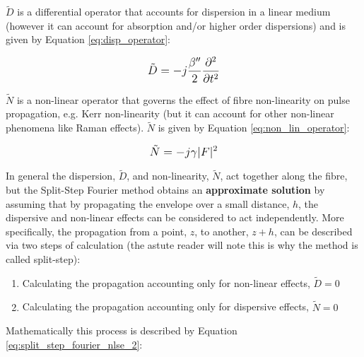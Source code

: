 \documentclass[colorlinks,11pt,a4paper,normalphoto,withhyper,ragged2e]{altareport}
\begin{document}
	
	\vspace{5mm}
	
	
	$\tilde{D}$ is a differential operator that accounts for dispersion in a linear medium (however it can account for absorption and/or higher order dispersions) and is given by Equation \ref{eq:disp_operator}:
	
	\begin{equation} \label{eq:disp_operator}
       \mathlarger{ \tilde{D} = - j \frac{ \beta ''}{2} \frac{\partial^2}{\partial t^2} }
	\end{equation}
	
	
	\vspace{5mm}
	
	
	$\tilde{N}$ is a non-linear operator that governs the effect of fibre non-linearity on pulse propagation, e.g. Kerr non-linearity (but it can account for other non-linear phenomena like Raman effects). $\tilde{N}$ is given by Equation \ref{eq:non_lin_operator}:
	
	\begin{equation} \label{eq:non_lin_operator}
       \mathlarger{ \tilde{N} = - j \gamma |F|^2 }
	\end{equation}
	
	
	\vspace{5mm}
	
	
	In general the dispersion, $\tilde{D}$, and non-linearity, $\tilde{N}$, act together along the fibre, but the Split-Step Fourier method obtains an \textbf{approximate solution} by assuming that by propagating the envelope over a small distance, $h$, the dispersive and non-linear effects can be considered to act independently. \linebreak 
	More specifically, the propagation from a point, $z$, to another, $z+h$, can be described via two steps of calculation (the astute reader will note this is why the method is called split-step): \vspace{5mm}
	
	\begin{enumerate}[leftmargin=1cm]
		\item Calculating the propagation accounting only for non-linear effects, $\tilde{D} = 0$
		\item Calculating the propagation accounting only for dispersive effects, $\tilde{N} = 0$
	\end{enumerate}
	
	
	\vspace{5mm}
	
	
	Mathematically this process is described by Equation \ref{eq:split_step_fourier_nlse_2}:
	
\end{document}
